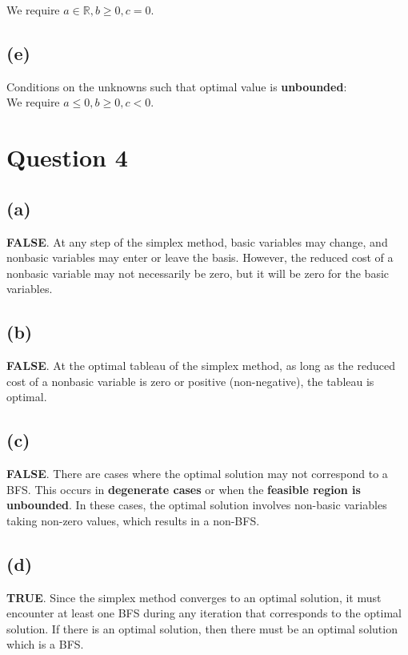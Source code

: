 \documentclass[12pt]{article}
\begin{document}
\noindent We require $a \in \mathbb{R}, b \geq 0, c = 0$.

\subsection*{(e)}
Conditions on the unknowns such that optimal value is \textbf{unbounded}: \\ 

\noindent We require $a \leq 0, b \geq 0, c < 0$.

\newpage

\section*{Question 4}

\subsection*{(a)}
\textbf{FALSE}. At any step of the simplex method, basic variables may change, and nonbasic variables may enter or leave the basis. However, the reduced cost of a nonbasic variable may not necessarily be zero, but it will be zero for the basic variables. 

\subsection*{(b)}
\textbf{FALSE}. At the optimal tableau of the simplex method, as long as the reduced cost of a nonbasic variable is zero or positive (non-negative), the tableau is optimal. 

\subsection*{(c)}
\textbf{FALSE}. There are cases where the optimal solution may not correspond to a BFS. This occurs in \textbf{degenerate cases} or when the \textbf{feasible region is unbounded}. In these cases, the optimal solution involves non-basic variables taking non-zero values, which results in a non-BFS.

\subsection*{(d)}
\textbf{TRUE}. Since the simplex method converges to an optimal solution, it must encounter at least one BFS during any iteration that corresponds to the optimal solution. If there is an optimal solution, then there must be an optimal solution which is a BFS. 
\end{document}
